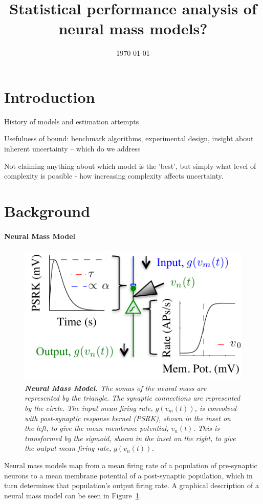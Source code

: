 \documentclass{article}
\title{Statistical performance analysis of neural mass models?}
\date{\today}
\begin{document}
\section{Introduction}


History of models and estimation attempts

Usefulness of bound: benchmark algorithms, experimental design, insight about inherent uncertainty -- which do we address


Not claiming anything about which model is the 'best', but simply what level of complexity is possible - how increasing complexity affects uncertainty.
\section{Background}
\label{sec:background}


\paragraph{Neural Mass Model}
\begin{figure}[ht]
  \begin{center}
    \includegraphics{./figures/pdf/SingleMass.pdf}
  \end{center}
  \caption{\emph{\textbf{Neural Mass Model.} The somas of the neural mass are represented by the triangle. The synaptic connections are represented by the circle. The input mean firing rate, $g(v_m(t))$, is convolved with post-synaptic response kernel (PSRK), shown in the inset on the left, to give the mean membrane potential, $v_n(t)$. This is transformed by the sigmoid, shown in the inset on the right, to give the output mean firing rate, $g(v_n(t))$.}}
  \label{fig:SingleNeuralMass}
\end{figure}
Neural mass models map from a mean firing rate of a population of pre-synaptic neurons to a mean membrane potential of a post-synaptic population, which in turn determines that population's output firing rate. A graphical description of a neural mass model can be seen in Figure~\ref{fig:SingleNeuralMass}. 
\end{document}
